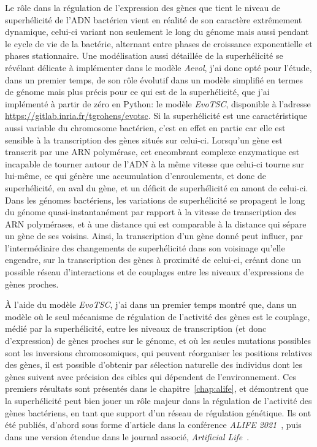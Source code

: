 Le rôle dans la régulation de l'expression des gènes que tient le niveau de superhélicité de l'ADN bactérien vient en réalité de son caractère extrêmement dynamique, celui-ci variant non seulement le long du génome mais aussi pendant le cycle de vie de la bactérie, alternant entre phases de croissance exponentielle et phases stationnaire.
Une modélisation aussi détaillée de la superhélicité se révélant délicate à implémenter dans le modèle \emph{Aevol}, j'ai donc opté pour l'étude, dans un premier temps, de son rôle évolutif dans un modèle simplifié en termes de génome mais plus précis pour ce qui est de la superhélicité, que j'ai implémenté à partir de zéro en Python: le modèle \emph{EvoTSC}, disponible à l'adresse \url{https://gitlab.inria.fr/tgrohens/evotsc}.
Si la superhélicité est une caractéristique aussi variable du chromosome bactérien, c'est en effet en partie car elle est sensible à la transcription des gènes situés sur celui-ci.
Lorsqu'un gène est transcrit par une ARN polymérase, cet encombrant complexe enzymatique est incapable de tourner autour de l'ADN à la même vitesse que celui-ci tourne sur lui-même, ce qui génère une accumulation d'enroulements, et donc de superhélicité, en aval du gène, et un déficit de superhélicité en amont de celui-ci.
Dans les génomes bactériens, les variations de superhélicité se propagent le long du génome quasi-instantanément par rapport à la vitesse de transcription des ARN polymérases, et à une distance qui est comparable à la distance qui sépare un gène de ses voisins.
Ainsi, la transcription d'un gène donné peut influer, par l'intermédiaire des changements de superhélicité dans son voisinage qu'elle engendre, sur la transcription des gènes à proximité de celui-ci, créant donc un possible réseau d'interactions et de couplages entre les niveaux d'expressions de gènes proches.

À l'aide du modèle \emph{EvoTSC}, j'ai dans un premier temps montré que, dans un modèle où le seul mécanisme de régulation de l'activité des gènes est le couplage, médié par la superhélicité, entre les niveaux de transcription (et donc d'expression) de gènes proches sur le génome, et où les seules mutations possibles sont les inversions chromosomiques, qui peuvent réorganiser les positions relatives des gènes, il est possible d'obtenir par sélection naturelle des individus dont les gènes suivent avec précision des cibles qui dépendent de l'environnement.
Ces premiers résultats sont présentés dans le chapitre~\ref{chap:alife}, et démontrent que la superhélicité peut bien jouer un rôle majeur dans la régulation de l'activité des gènes bactériens, en tant que support d'un réseau de régulation génétique.
Ils ont été publiés, d'abord sous forme d'article dans la conférence \emph{ALIFE 2021}~\citep{grohens2021}, puis dans une version étendue dans le journal associé, \emph{Artificial Life}~\citep{grohens2022a}.

